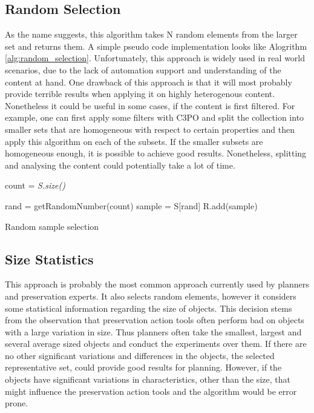 \subsection{Random Selection}
As the  name suggests, this algorithm takes N random elements from the larger set and returns them. A simple pseudo code implementation looks like Alogrithm \ref{alg:random_selection}. Unfortunately, this approach is widely used in real world scenarios, due to the lack of automation support and understanding of the content at hand. One drawback of this approach is that it will most probably provide terrible results when applying it on highly heterogenous content.
Nonetheless it could be useful in some cases, if the content is first filtered. For example, one can first apply some filters with C3PO and split the collection into smaller sets that are homogeneous with respect to certain properties and then apply this algorithm on each of the subsets. If the smaller subsets are homogeneous enough, it is possible to achieve good results. Nonetheless, splitting and analysing the content could potentially take a lot of time.

\begin{algorithm}[!htb]

 \BlankLine

 count = \textit{S.size()}\; 
 
  {
   rand = getRandomNumber(count)\;
   sample = S[rand]\;
   R.add(sample)\; 
 }
 
 \caption{Random sample selection}
 \label{alg:random_selection}
\end{algorithm}

\subsection{Size Statistics}
This approach is probably the most common approach currently used by planners and preservation experts. It also selects random elements, however it considers some statistical information regarding the size of objects. This decision stems from the observation that preservation action tools often perform bad on objects with a large variation in size. Thus planners often take the smallest, largest and several average sized objects and conduct the experiments over them. If there are no other significant variations and differences in the objects, the selected representative set, could provide good results for planning. However, if the objects have significant variations in characteristics, other than the size, that might influence the preservation action tools and the algorithm would be error prone.

